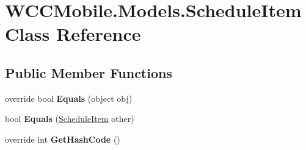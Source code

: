 \hypertarget{class_w_c_c_mobile_1_1_models_1_1_schedule_item}{}\section{W\+C\+C\+Mobile.\+Models.\+Schedule\+Item Class Reference}
\label{class_w_c_c_mobile_1_1_models_1_1_schedule_item}
\subsection*{Public Member Functions}
\begin{DoxyCompactItemize}
\item 
override bool {\bfseries Equals} (object obj)\hypertarget{class_w_c_c_mobile_1_1_models_1_1_schedule_item_a5175c56d2815231179968c78c250e4d2}{}\label{class_w_c_c_mobile_1_1_models_1_1_schedule_item_a5175c56d2815231179968c78c250e4d2}

\item 
bool {\bfseries Equals} (\hyperlink{class_w_c_c_mobile_1_1_models_1_1_schedule_item}{Schedule\+Item} other)\hypertarget{class_w_c_c_mobile_1_1_models_1_1_schedule_item_adb957c9403cd42982874c4840eb28f8c}{}\label{class_w_c_c_mobile_1_1_models_1_1_schedule_item_adb957c9403cd42982874c4840eb28f8c}

\item 
override int {\bfseries Get\+Hash\+Code} ()\hypertarget{class_w_c_c_mobile_1_1_models_1_1_schedule_item_af118b43db33df259e0c9377fcc98a1ac}{}\label{class_w_c_c_mobile_1_1_models_1_1_schedule_item_af118b43db33df259e0c9377fcc98a1ac}

\end{DoxyCompactItemize}
